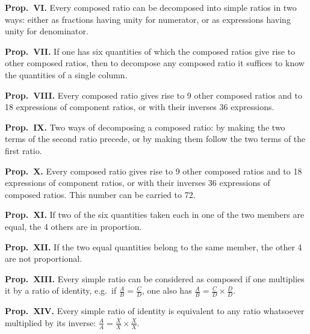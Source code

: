 \documentclass[11pt,a4paper]{article}
\theoremstyle{plain}
\theoremstyle{definition}
\theoremstyle{remark}
\begin{document}
\noindent\textbf{Prop.~VI.} Every composed ratio can be decomposed into simple ratios in two ways: either as fractions having unity for numerator, or as expressions having unity for denominator.

\vspace{0.2cm}

\noindent\textbf{Prop.~VII.} If one has six quantities of which the composed ratios give rise to other composed ratios, then to decompose any composed ratio it suffices to know the quantities of a single column.

\vspace{0.2cm}

\noindent\textbf{Prop.~VIII.} Every composed ratio gives rise to 9 other composed ratios and to 18 expressions of component ratios, or with their inverses 36 expressions.

\vspace{0.2cm}

\noindent\textbf{Prop.~IX.} Two ways of decomposing a composed ratio: by making the two terms of the second ratio precede, or by making them follow the two terms of the first ratio.

\vspace{0.2cm}

\noindent\textbf{Prop.~X.} Every composed ratio gives rise to 9 other composed ratios and to 18 expressions of component ratios, or with their inverses 36 expressions of composed ratios. This number can be carried to 72.

\vspace{0.2cm}

\noindent\textbf{Prop.~XI.} If two of the six quantities taken each in one of the two members are equal, the 4 others are in proportion.

\vspace{0.2cm}

\noindent\textbf{Prop.~XII.} If the two equal quantities belong to the same member, the other 4 are not proportional.

\vspace{0.2cm}

\noindent\textbf{Prop.~XIII.} Every simple ratio can be considered as composed if one multiplies it by a ratio of identity, e.g.~if $\frac{A}{B} = \frac{C}{D}$, one also has $\frac{A}{B} = \frac{C}{D} \times \frac{D}{D}$.

\vspace{0.2cm}

\noindent\textbf{Prop.~XIV.} Every simple ratio of identity is equivalent to any ratio whatsoever multiplied by its inverse: $\frac{A}{A} = \frac{X}{X} \times \frac{X}{X}$.
\end{document}
